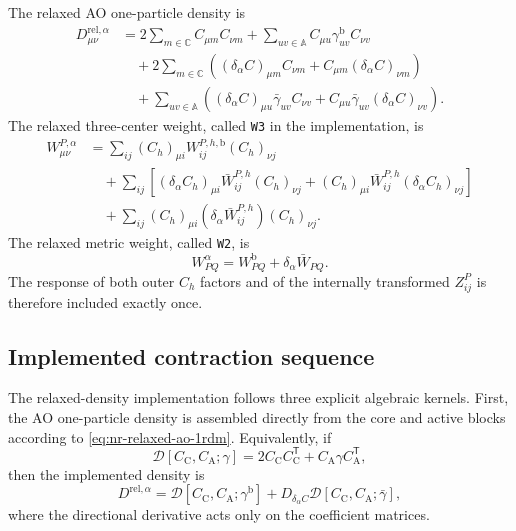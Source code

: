 \documentclass[aip,preprint,nofootinbib]{revtex4-1}
\newcommand{\core}{\mathrm{C}}
\newcommand{\act}{\mathrm{A}}
\begin{document}
The relaxed AO one-particle density is
\begin{align}
 D^{\mathrm{rel},\alpha}_{\mu\nu}
 &=2\sum_{m\in\mathbb C}C_{\mu m}C_{\nu m}
 +\sum_{uv\in\mathbb A}C_{\mu u}\gamma^{\mathrm b}_{uv}C_{\nu v}
 \nonumber\\
 &\quad+2\sum_{m\in\mathbb C}\left(
 (\delta_\alpha C)_{\mu m}C_{\nu m}
 +C_{\mu m}(\delta_\alpha C)_{\nu m}\right)
 \nonumber\\
 &\quad+\sum_{uv\in\mathbb A}\left(
 (\delta_\alpha C)_{\mu u}\bar\gamma_{uv}C_{\nu v}
 +C_{\mu u}\bar\gamma_{uv}(\delta_\alpha C)_{\nu v}\right).
 \label{eq:nr-relaxed-ao-1rdm}
\end{align}
The relaxed three-center weight, called \texttt{W3} in the implementation, is
\begin{align}
 W^{P,\alpha}_{\mu\nu}
 &=\sum_{ij}(C_h)_{\mu i}W^{P,h,\mathrm b}_{ij}(C_h)_{\nu j}
 \nonumber\\
 &\quad+\sum_{ij}\left[
 (\delta_\alpha C_h)_{\mu i}\bar W^{P,h}_{ij}(C_h)_{\nu j}
 +(C_h)_{\mu i}\bar W^{P,h}_{ij}(\delta_\alpha C_h)_{\nu j}
 \right]
 \nonumber\\
 &\quad+\sum_{ij}(C_h)_{\mu i}
 (\delta_\alpha\bar W^{P,h}_{ij})(C_h)_{\nu j}.
 \label{eq:nr-relaxed-w3}
\end{align}
The relaxed metric weight, called \texttt{W2}, is
\begin{equation}
 W^\alpha_{PQ}=W^{\mathrm b}_{PQ}+\delta_\alpha\bar W_{PQ}.
 \label{eq:nr-relaxed-w2}
\end{equation}
The response of both outer $C_h$ factors and of the internally transformed
$Z^P_{ij}$ is therefore included exactly once.

\subsection{Implemented contraction sequence}

The relaxed-density implementation follows three explicit algebraic kernels.
First, the AO one-particle density is assembled directly from the core and
active blocks according to \cref{eq:nr-relaxed-ao-1rdm}.  Equivalently, if
\begin{equation}
 \mathcal D[C_{\core},C_{\act};\gamma]
 =2C_{\core}C_{\core}^{\mathsf T}
  +C_{\act}\gamma C_{\act}^{\mathsf T},
\end{equation}
then the implemented density is
\begin{equation}
 D^{\mathrm{rel},\alpha}
 =\mathcal D[C_{\core},C_{\act};\gamma^{\mathrm b}]
 +D_{\delta_\alpha C}\mathcal D[C_{\core},C_{\act};\bar\gamma],
 \label{eq:nr-implemented-relaxed-d1}
\end{equation}
where the directional derivative acts only on the coefficient matrices.
\end{document}
